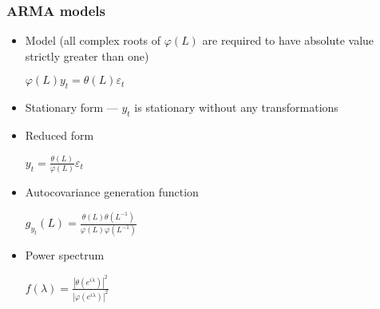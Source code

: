 \documentclass[12pt]{article}
\theoremstyle{definition}
\theoremstyle{remark}
\numberwithin{equation}{section}
\begin{document}
\subsubsection{ARMA models}

\begin{itemize}
	\item Model (all complex roots of $\varphi(L)$ are required to have absolute value strictly greater than one)

	$\varphi(L) y_t = \theta(L) \varepsilon_t$

	\item Stationary form --- $y_t$ is stationary without any transformations

	\item Reduced form

	$y_t = \frac {\theta(L)}{\varphi(L)} \varepsilon_t$

	\item Autocovariance generation function

	$g_{y_t}(L) = \frac {\theta(L)\theta(L^{-1})}{\varphi(L)\varphi(L^{-1})}$

	\item Power spectrum

	$f(\lambda) = \frac{|\theta(e^{i\lambda})|^2}{|\varphi(e^{i\lambda})|^2}$


\end{itemize}
\end{document}
